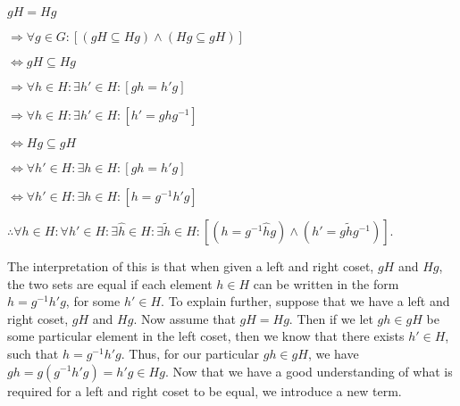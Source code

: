 \documentclass[12pt, a4paper]{article}
\begin{document}
\vspace{4mm}

\hspace{2mm} $gH=Hg$\par
\vspace{2mm}
\hspace{10mm} $\Rightarrow\forall g\in G\colon[(gH\subseteq Hg)\wedge(Hg\subseteq gH)]$\par
\vspace{2mm}
\hspace{10mm} $\Leftrightarrow gH\subseteq Hg$\par
\vspace{2mm}
\hspace{10mm} $\Rightarrow\forall h\in H\colon\exists h'\in H\colon[gh=h'g]$\par
\vspace{2mm}
\hspace{10mm} $\Rightarrow\forall h\in H\colon\exists h'\in H\colon[ h'=ghg^{-1}]$\par
\vspace{2mm}
\hspace{10mm} $\Leftrightarrow Hg\subseteq gH$\par
\vspace{2mm}
\hspace{10mm} $\Leftrightarrow\forall h'\in H\colon\exists h\in H\colon[gh=h'g]$\par
\vspace{2mm}
\hspace{10mm} $\Leftrightarrow\forall h'\in H\colon\exists h\in H\colon[h=g^{-1}h'g]$\par
\vspace{2mm}
\hspace{2mm} $\therefore\forall h\in H\colon\forall h'\in H\colon\exists\hat{h}\in H\colon\exists\tilde{h}\in H\colon[(h=g^{-1}\hat{h}g)\wedge(h'=g\tilde{h}g^{-1})]$.

\vspace{4mm}

    The interpretation of this is that when given a left and right coset, $gH$ and $Hg$, the two sets are equal if each element $h\in H$ can be written in the form $h=g^{-1}h'g$, for some $h'\in H$. To explain further, suppose that we have a left and right coset, $gH$ and $Hg$. Now assume that $gH=Hg$. Then if we let $gh\in gH$ be some particular element in the left coset, then we know that there exists $h'\in H$, such that $h=g^{-1}h'g$. Thus, for our particular $gh\in gH$, we have $gh=g(g^{-1}h'g)=h'g\in Hg$. Now that we have a good understanding of what is required for a left and right coset to be equal, we introduce a new term.\par
    
\end{document}
